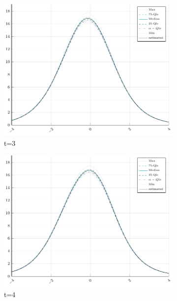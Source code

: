 \begin{figure}[H]
\begin{subfigure}[t]{0.31\textwidth}
		\centering
		\includegraphics[width=\linewidth]{Figures/real/3_infoplot.pdf}
		\caption{t=3} 
	\end{subfigure}
	\begin{subfigure}[t]{0.31\textwidth}
		\centering
		\includegraphics[width=\linewidth]{Figures/real/4_infoplot.pdf}
		\caption{t=4} 
	\end{subfigure}\\
	\begin{subfigure}[t]{0.31\textwidth}
		\centering

\end{subfigure}
\end{figure}
